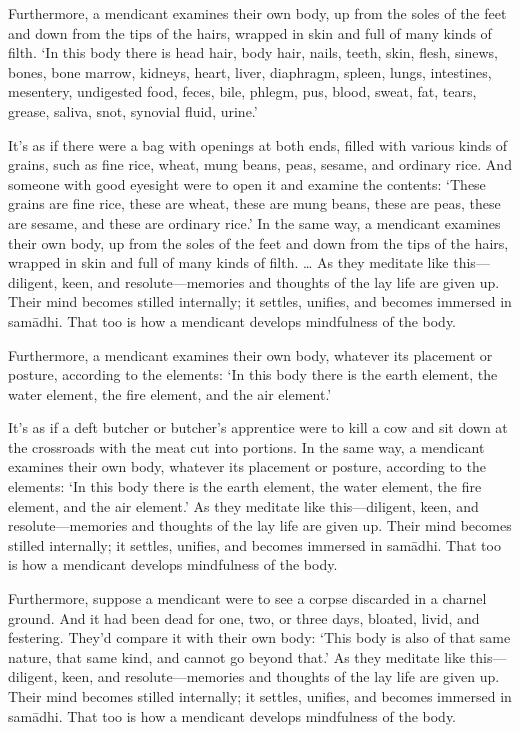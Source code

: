 \documentclass[12pt,openany]{book}%
\begin{document}
Furthermore, a mendicant examines their own body, up from the soles of the feet and down from the tips of the hairs, wrapped in skin and full of many kinds of filth. ‘In this body there is head hair, body hair, nails, teeth, skin, flesh, sinews, bones, bone marrow, kidneys, heart, liver, diaphragm, spleen, lungs, intestines, mesentery, undigested food, feces, bile, phlegm, pus, blood, sweat, fat, tears, grease, saliva, snot, synovial fluid, urine.’ 

It’s as if there were a bag with openings at both ends, filled with various kinds of grains, such as fine rice, wheat, mung beans, peas, sesame, and ordinary rice. And someone with good eyesight were to open it and examine the contents: ‘These grains are fine rice, these are wheat, these are mung beans, these are peas, these are sesame, and these are ordinary rice.’ In the same way, a mendicant examines their own body, up from the soles of the feet and down from the tips of the hairs, wrapped in skin and full of many kinds of filth. … As they meditate like this—diligent, keen, and resolute—memories and thoughts of the lay life are given up. Their mind becomes stilled internally; it settles, unifies, and becomes immersed in \textsanskrit{samādhi}. That too is how a mendicant develops mindfulness of the body. 

Furthermore, a mendicant examines their own body, whatever its placement or posture, according to the elements: ‘In this body there is the earth element, the water element, the fire element, and the air element.’ 

It’s as if a deft butcher or butcher’s apprentice were to kill a cow and sit down at the crossroads with the meat cut into portions. In the same way, a mendicant examines their own body, whatever its placement or posture, according to the elements: ‘In this body there is the earth element, the water element, the fire element, and the air element.’ As they meditate like this—diligent, keen, and resolute—memories and thoughts of the lay life are given up. Their mind becomes stilled internally; it settles, unifies, and becomes immersed in \textsanskrit{samādhi}. That too is how a mendicant develops mindfulness of the body. 

Furthermore, suppose a mendicant were to see a corpse discarded in a charnel ground. And it had been dead for one, two, or three days, bloated, livid, and festering. They’d compare it with their own body: ‘This body is also of that same nature, that same kind, and cannot go beyond that.’ As they meditate like this—diligent, keen, and resolute—memories and thoughts of the lay life are given up. Their mind becomes stilled internally; it settles, unifies, and becomes immersed in \textsanskrit{samādhi}. That too is how a mendicant develops mindfulness of the body. 
\end{document}
